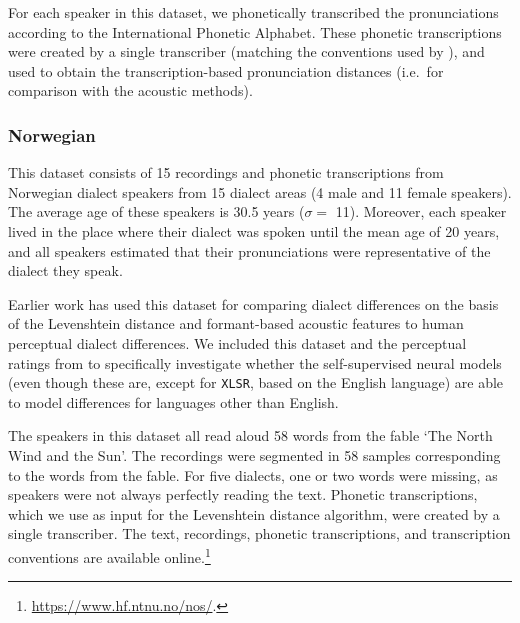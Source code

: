 \documentclass[11pt,a4paper]{article}
\begin{document}
For each speaker in this dataset, we phonetically transcribed the pronunciations according to the International Phonetic Alphabet. These phonetic transcriptions were created by a single transcriber (matching the conventions used by \citealt{wieling2014a}), and used to obtain the transcription-based pronunciation distances (i.e.~for comparison with the acoustic methods).

\subsubsection{Norwegian}
This dataset consists of 15 recordings and phonetic transcriptions from Norwegian dialect speakers from 15 dialect areas (4 male and 11 female speakers). The average age of these speakers is 30.5 years ($\sigma=$ 11). Moreover, each speaker lived in the place where their dialect was spoken until the mean age of 20 years, and all speakers estimated that their pronunciations were representative of the dialect they speak.

Earlier work has used this dataset for comparing dialect differences on the basis of the Levenshtein distance \citep{gooskens2004perceptive} and formant-based acoustic features \citep{heeringa2009measuring} to human perceptual dialect differences. We included this dataset and the perceptual ratings from \citet{gooskens2004perceptive} to specifically investigate whether the self-supervised neural models (even though these are, except for \texttt{XLSR}, based on the English language) are able to model differences for languages other than English. 

The speakers in this dataset all read aloud 58 words from the fable `The North Wind and the Sun'. The recordings were segmented in 58 samples corresponding to the words from the fable. For five dialects, one or two words were missing, as speakers were not always perfectly reading the text. 
Phonetic transcriptions, which we use as input for the Levenshtein distance algorithm, were created by a single transcriber.
The text, recordings, phonetic transcriptions, and transcription conventions are available online.\footnote{\url{https://www.hf.ntnu.no/nos/}.}

\end{document}
